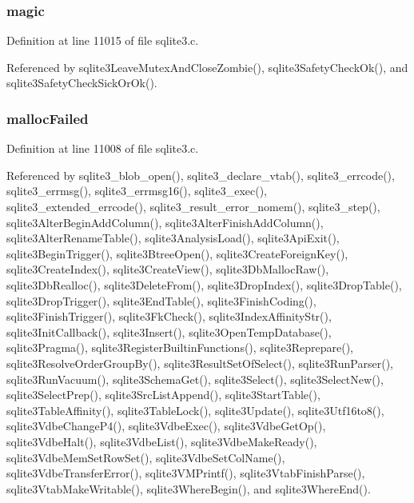\subsubsection[{magic}]{ magic}\label{structsqlite3_a1c2f2992893a71ac0ee3f43477000176}


Definition at line 11015 of file sqlite3.\+c.



Referenced by sqlite3\+Leave\+Mutex\+And\+Close\+Zombie(), sqlite3\+Safety\+Check\+Ok(), and sqlite3\+Safety\+Check\+Sick\+Or\+Ok().

\hypertarget{structsqlite3_a0d82e9510ad64166fce6b3c31cc73306}{}
\subsubsection[{malloc\+Failed}]{ malloc\+Failed}\label{structsqlite3_a0d82e9510ad64166fce6b3c31cc73306}


Definition at line 11008 of file sqlite3.\+c.



Referenced by sqlite3\+\_\+blob\+\_\+open(), sqlite3\+\_\+declare\+\_\+vtab(), sqlite3\+\_\+errcode(), sqlite3\+\_\+errmsg(), sqlite3\+\_\+errmsg16(), sqlite3\+\_\+exec(), sqlite3\+\_\+extended\+\_\+errcode(), sqlite3\+\_\+result\+\_\+error\+\_\+nomem(), sqlite3\+\_\+step(), sqlite3\+Alter\+Begin\+Add\+Column(), sqlite3\+Alter\+Finish\+Add\+Column(), sqlite3\+Alter\+Rename\+Table(), sqlite3\+Analysis\+Load(), sqlite3\+Api\+Exit(), sqlite3\+Begin\+Trigger(), sqlite3\+Btree\+Open(), sqlite3\+Create\+Foreign\+Key(), sqlite3\+Create\+Index(), sqlite3\+Create\+View(), sqlite3\+Db\+Malloc\+Raw(), sqlite3\+Db\+Realloc(), sqlite3\+Delete\+From(), sqlite3\+Drop\+Index(), sqlite3\+Drop\+Table(), sqlite3\+Drop\+Trigger(), sqlite3\+End\+Table(), sqlite3\+Finish\+Coding(), sqlite3\+Finish\+Trigger(), sqlite3\+Fk\+Check(), sqlite3\+Index\+Affinity\+Str(), sqlite3\+Init\+Callback(), sqlite3\+Insert(), sqlite3\+Open\+Temp\+Database(), sqlite3\+Pragma(), sqlite3\+Register\+Builtin\+Functions(), sqlite3\+Reprepare(), sqlite3\+Resolve\+Order\+Group\+By(), sqlite3\+Result\+Set\+Of\+Select(), sqlite3\+Run\+Parser(), sqlite3\+Run\+Vacuum(), sqlite3\+Schema\+Get(), sqlite3\+Select(), sqlite3\+Select\+New(), sqlite3\+Select\+Prep(), sqlite3\+Src\+List\+Append(), sqlite3\+Start\+Table(), sqlite3\+Table\+Affinity(), sqlite3\+Table\+Lock(), sqlite3\+Update(), sqlite3\+Utf16to8(), sqlite3\+Vdbe\+Change\+P4(), sqlite3\+Vdbe\+Exec(), sqlite3\+Vdbe\+Get\+Op(), sqlite3\+Vdbe\+Halt(), sqlite3\+Vdbe\+List(), sqlite3\+Vdbe\+Make\+Ready(), sqlite3\+Vdbe\+Mem\+Set\+Row\+Set(), sqlite3\+Vdbe\+Set\+Col\+Name(), sqlite3\+Vdbe\+Transfer\+Error(), sqlite3\+V\+M\+Printf(), sqlite3\+Vtab\+Finish\+Parse(), sqlite3\+Vtab\+Make\+Writable(), sqlite3\+Where\+Begin(), and sqlite3\+Where\+End().

